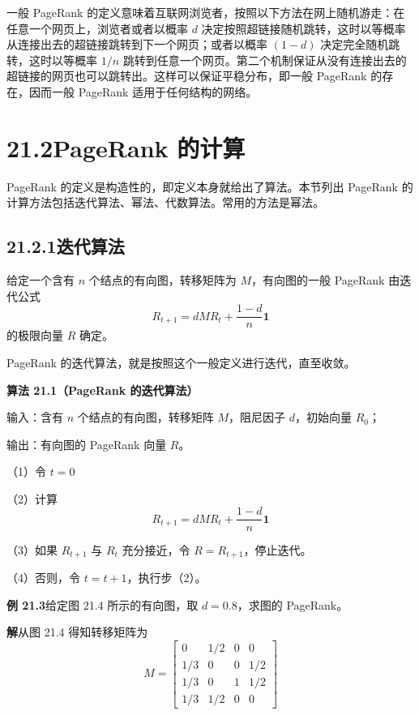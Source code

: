 \documentclass[UTF8, 12pt, fontset=fandol, oneside]{ctexart}
\begin{document}
一般 PageRank 的定义意味着互联网浏览者，按照以下方法在网上随机游走：在任意一个网页上，浏览者或者以概率 $d$ 决定按照超链接随机跳转，这时以等概率从连接出去的超链接跳转到下一个网页；或者以概率 $(1-d)$ 决定完全随机跳转，这时以等概率 $1/n$ 跳转到任意一个网页。第二个机制保证从没有连接出去的超链接的网页也可以跳转出。这样可以保证平稳分布，即一般 PageRank 的存在，因而一般 PageRank 适用于任何结构的网络。

\section*{21.2\quad PageRank 的计算}

PageRank 的定义是构造性的，即定义本身就给出了算法。本节列出 PageRank 的计算方法包括迭代算法、幂法、代数算法。常用的方法是幂法。

\subsection*{21.2.1\quad 迭代算法}

给定一个含有 $n$ 个结点的有向图，转移矩阵为 $M$，有向图的一般 PageRank 由迭代公式
\begin{equation}
R_{t+1}=dMR_t+\frac{1-d}{n}\mathbf{1}
\tag{21.15}
\end{equation}
的极限向量 $R$ 确定。

PageRank 的迭代算法，就是按照这个一般定义进行迭代，直至收敛。

\noindent\textbf{算法 21.1（PageRank 的迭代算法）}

输入：含有 $n$ 个结点的有向图，转移矩阵 $M$，阻尼因子 $d$，初始向量 $R_0$；

输出：有向图的 PageRank 向量 $R$。

（1）令 $t=0$

（2）计算
\[
R_{t+1}=dMR_t+\frac{1-d}{n}\mathbf{1}
\]

（3）如果 $R_{t+1}$ 与 $R_t$ 充分接近，令 $R=R_{t+1}$，停止迭代。

（4）否则，令 $t=t+1$，执行步（2）。

\noindent\textbf{例 21.3}\quad 给定图 21.4 所示的有向图，取 $d=0.8$，求图的 PageRank。

\noindent\textbf{解}\quad 从图 21.4 得知转移矩阵为
\[
M=
\begin{bmatrix}
0 & 1/2 & 0 & 0\\
1/3 & 0 & 0 & 1/2\\
1/3 & 0 & 1 & 1/2\\
1/3 & 1/2 & 0 & 0
\end{bmatrix}
\]
\end{document}
